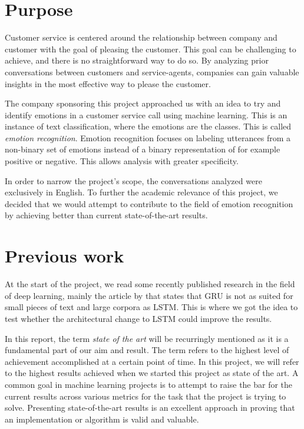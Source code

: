 \documentclass[nofilelist]{cslthse-msc}
\begin{document}

\section{Purpose}
Customer service is centered around the relationship between company and customer with the goal of pleasing the customer. This goal can be challenging to achieve, and there is no straightforward way to do so. By analyzing prior conversations between customers and service-agents, companies can gain valuable insights in the most effective way to please the customer. 



The company sponsoring this project approached us with an idea to try and identify emotions in a customer service call using machine learning. This is an instance of text classification, where the emotions are the classes. This is called \textit{emotion recognition}. Emotion recognition focuses on labeling utterances from a non-binary set of emotions instead of a binary representation of for example positive or negative. This allows analysis with greater specificity.  

In order to narrow the project's scope, the conversations analyzed were exclusively in English. %
To further the academic relevance of this project, we decided that we would attempt to contribute to the field of emotion recognition by achieving better than current state-of-the-art results. 

\section{Previous work}



At the start of the project, we read some recently published research in the field of deep learning, mainly the article by \citet{edseee.922172720200601} that states that GRU is not as suited for small pieces of text and large corpora as LSTM. This is where we got the idea to test whether the architectural change to LSTM could improve the results. 


In this report, the term \emph{state of the art} will be recurringly mentioned as it is a fundamental part of our aim and result. The term refers to the highest level of achievement accomplished at a certain point of time. In this project, we will refer to the highest results achieved when we started this project as state of the art. A common goal in machine learning projects is to attempt to raise the bar for the current results across various metrics for the task that the project is trying to solve. Presenting state-of-the-art results is an excellent approach in proving that an implementation or algorithm is valid and valuable.   
\end{document}
